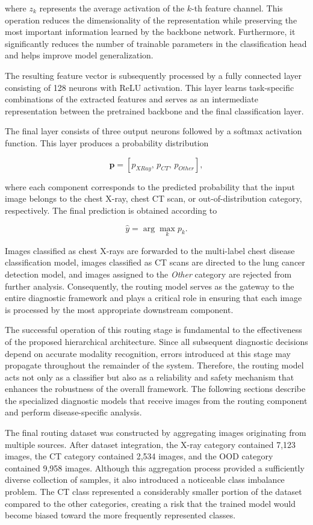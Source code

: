 where \(z_k\) represents the average activation of the \(k\)-th feature channel. This operation reduces the dimensionality of the representation while preserving the most important information learned by the backbone network. Furthermore, it significantly reduces the number of trainable parameters in the classification head and helps improve model generalization.

The resulting feature vector is subsequently processed by a fully connected layer consisting of 128 neurons with ReLU activation. This layer learns task-specific combinations of the extracted features and serves as an intermediate representation between the pretrained backbone and the final classification layer.

The final layer consists of three output neurons followed by a softmax activation function. This layer produces a probability distribution

\[
\mathbf{p}
=
[p_{XRay},\,p_{CT},\,p_{Other}],
\]

where each component corresponds to the predicted probability that the input image belongs to the chest X-ray, chest CT scan, or out-of-distribution category, respectively. The final prediction is obtained according to

\[
\hat{y}
=
\arg\max_k p_k.
\]

Images classified as chest X-rays are forwarded to the multi-label chest disease classification model, images classified as CT scans are directed to the lung cancer detection model, and images assigned to the \emph{Other} category are rejected from further analysis. Consequently, the routing model serves as the gateway to the entire diagnostic framework and plays a critical role in ensuring that each image is processed by the most appropriate downstream component.

The successful operation of this routing stage is fundamental to the effectiveness of the proposed hierarchical architecture. Since all subsequent diagnostic decisions depend on accurate modality recognition, errors introduced at this stage may propagate throughout the remainder of the system. Therefore, the routing model acts not only as a classifier but also as a reliability and safety mechanism that enhances the robustness of the overall framework. The following sections describe the specialized diagnostic models that receive images from the routing component and perform disease-specific analysis.

The final routing dataset was constructed by aggregating images originating from multiple sources. After dataset integration, the X-ray category contained 7,123 images, the CT category contained 2,534 images, and the OOD category contained 9,958 images. Although this aggregation process provided a sufficiently diverse collection of samples, it also introduced a noticeable class imbalance problem. The CT class represented a considerably smaller portion of the dataset compared to the other categories, creating a risk that the trained model would become biased toward the more frequently represented classes.

